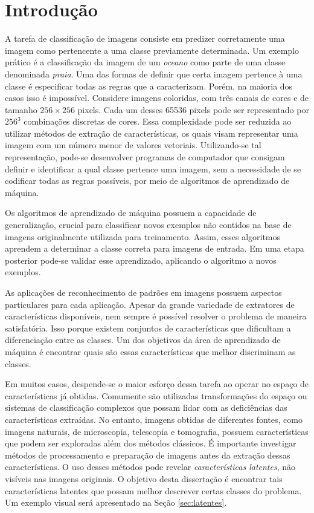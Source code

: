 \chapter{Introdução}

\meutodo{}

A tarefa de classificação de imagens consiste em predizer corretamente uma imagem como pertencente a uma classe previamente determinada. 
Um exemplo prático é a classificação da imagem de um \textit{oceano} como parte de uma classe denominada \textit{praia}.
Uma das formas de definir que certa imagem pertence à uma classe é especificar todas as regras que a caracterizam. Porém, na maioria dos casos isso é impossível. Considere imagens coloridas, com três canais de cores e de tamanho $256\times256$ pixels. Cada um desses 65536 pixels pode ser representado por $256^3$ combinações discretas de cores. Essa complexidade pode ser reduzida ao utilizar métodos de extração de características, os quais visam representar uma imagem com um número menor de valores vetoriais. Utilizando-se tal representação, pode-se desenvolver programas de computador que consigam definir e identificar a qual classe pertence uma imagem, sem a necessidade de se codificar todas as regras possíveis, por meio de algoritmos de aprendizado de máquina.

Os algoritmos de aprendizado de máquina possuem a capacidade de generalização, crucial para classificar novos exemplos não contidos na base de imagens originalmente utilizada para treinamento. Assim, esses algoritmos aprendem a determinar a classe correta para imagens de entrada. Em uma etapa posterior pode-se validar esse aprendizado, aplicando o algoritmo a novos exemplos.

As aplicações de reconhecimento de padrões em imagens possuem aspectos particulares para cada aplicação. Apesar da grande variedade de extratores de características disponíveis, nem sempre é possível resolver o problema de maneira satisfatória. Isso porque existem conjuntos de características que dificultam a diferenciação entre as classes. Um dos objetivos da área de aprendizado de máquina é encontrar quais são essas características que melhor discriminam as classes.

Em muitos casos, despende-se o maior esforço dessa tarefa ao operar no espaço de características já obtidas. Comumente são utilizadas transformações do espaço ou sistemas de classificação complexos que possam lidar com as deficiências das características extraídas. No entanto, imagens obtidas de diferentes fontes, como imagens naturais, de microscopia, telescopia e tomografia, possuem características que podem ser exploradas além dos métodos clássicos. É importante investigar métodos de processamento e preparação de imagens antes da extração dessas características. O uso desses métodos pode revelar \textit{características latentes}, não visíveis nas imagens originais. O objetivo desta dissertação é encontrar tais características latentes que possam melhor descrever certas classes do problema. Um exemplo visual será apresentado na Seção \ref{sec:latentes}.

